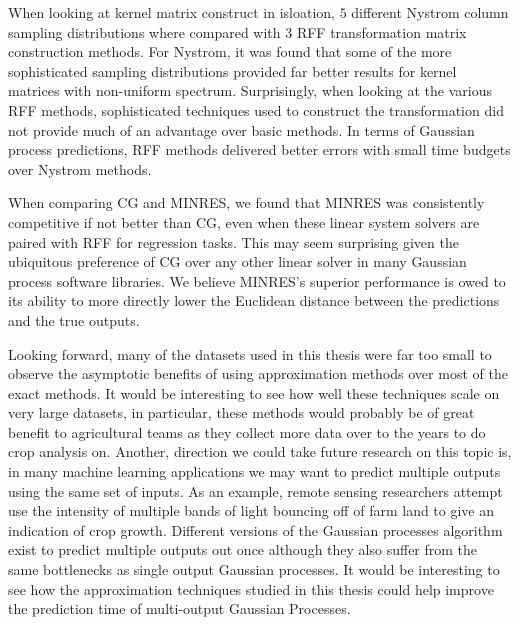 When looking at kernel matrix construct in isloation, $5$ different Nystrom column sampling distributions where compared with $3$ RFF transformation matrix construction methods. For Nystrom, it was found that some of the more sophisticated sampling distributions provided far better results for kernel matrices with non-uniform spectrum. Surprisingly, when looking at the various RFF methods, sophisticated techniques used to construct the transformation did not provide much of an advantage over basic methods. In terms of Gaussian process predictions, RFF methods delivered better errors with small time budgets over Nystrom methods.

When comparing CG and MINRES, we found that MINRES was consistently competitive if not better than CG, even when these linear system solvers are paired with RFF for regression tasks. This may seem surprising given the ubiquitous preference of CG over any other linear solver in many Gaussian process software libraries. We believe MINRES's superior performance is owed to its ability to more directly lower the Euclidean distance between the predictions and the true outputs.

Looking forward, many of the datasets used in this thesis were far too small to observe the asymptotic benefits of using approximation methods over most of the exact methods. It would be interesting to see how well these techniques scale on very large datasets, in particular, these methods would probably be of great benefit to agricultural teams as they collect more data over to the years to do crop analysis on. Another, direction we could take future research on this topic is, in many machine learning applications we may want to predict multiple outputs using the same set of inputs. As an example, remote sensing researchers attempt use the intensity of multiple bands of light bouncing off of farm land to give an indication of crop growth. Different versions of the Gaussian processes algorithm exist to predict multiple outputs out once although they also suffer from the same bottlenecks as single output Gaussian processes. It would be interesting to see how the approximation techniques studied in this thesis could help improve the prediction time of multi-output Gaussian Processes.